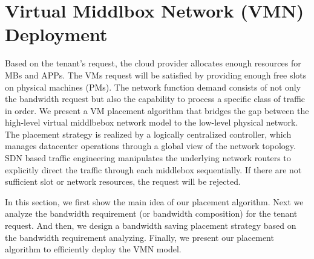 \documentclass[review]{elsarticle}
\begin{document}

\section{Virtual Middlbox Network (VMN) Deployment}\label{sec:algorithm}
Based on the tenant's request, the cloud provider allocates enough resources for MBs and APPs. The VMs request will be satisfied by providing enough free slots on physical machines (PMs). The network function demand consists of not only the bandwidth request but also the capability to process a specific class of traffic in order. We present a VM placement algorithm that bridges the gap between the high-level virtual middlbebox network model to the low-level physical network. The placement strategy is realized by a logically centralized controller, which manages datacenter operations through a global view of the network topology. SDN based traffic engineering manipulates the underlying network routers to explicitly direct the traffic through each middlebox sequentially. If there are not sufficient slot or network resources, the request will be rejected. 

In this section, we first show the main idea of our placement algorithm. Next we analyze the bandwidth requirement (or bandwidth composition) for the tenant request. And then, we design a bandwidth saving placement strategy based on the bandwidth requirement analyzing. Finally, we present our placement algorithm to efficiently deploy the VMN model. 
\end{document}

